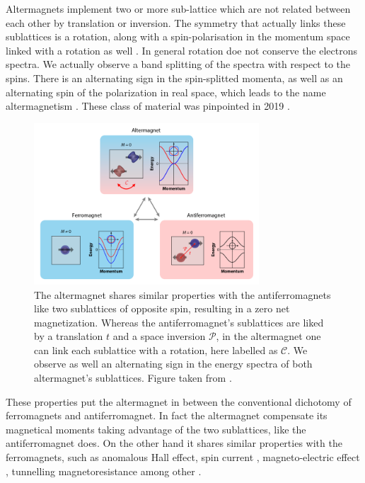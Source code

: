 \documentclass[../main.tex]{main.tex}
\begin{document}
Altermagnets implement two or more sub-lattice which are not related between each other by translation or inversion.
The symmetry that actually links these sublattices is a rotation,
along with a spin-polarisation in the momentum space linked with a rotation as well \cite{Smejkal2022}.
In general rotation doe not conserve the electrons spectra. We actually observe a band splitting of the spectra with respect to the spins.
There is an alternating sign in the spin-splitted momenta, as well as an alternating spin of the polarization in real space,
which leads to the name altermagnetism \cite{Smejkal2022_2}. These class of material was pinpointed in 2019 \cite{Hayami2019}.
\begin{figure}[H]
    \centering
    \includegraphics[width = 0.75\textwidth]{Ressources/AM.png}
    \caption{The altermagnet shares similar properties with the antiferromagnets like two sublattices of opposite spin, resulting in a zero net
    magnetization. Whereas the antiferromagnet's sublattices are liked by a translation $t$ and a space inversion $\mathcal{P}$, in the altermagnet one can link
    each sublattice with a rotation, here labelled as $\mathcal{C}$. We observe as well an alternating sign in the energy spectra of both altermagnet's sublattices. 
    Figure taken from \cite{Smejkal2022}\cite{Stonebraker}.}
\end{figure}


These properties put the altermagnet in between
the conventional dichotomy of ferromagnets and antiferromagnet. In fact the altermagnet compensate its magnetical moments taking advantage of the two
sublattices, like the antiferromagnet does. On the other hand it shares similar properties with the ferromagnets, such as anomalous Hall effect,
spin current \cite{Naka2021_2}, magneto-electric effect \cite{Smejkal2022_3}, tunnelling magnetoresistance \cite{Smejkal2022_4} among other \cite{Smejkal2022_2}.\\
\end{document}
